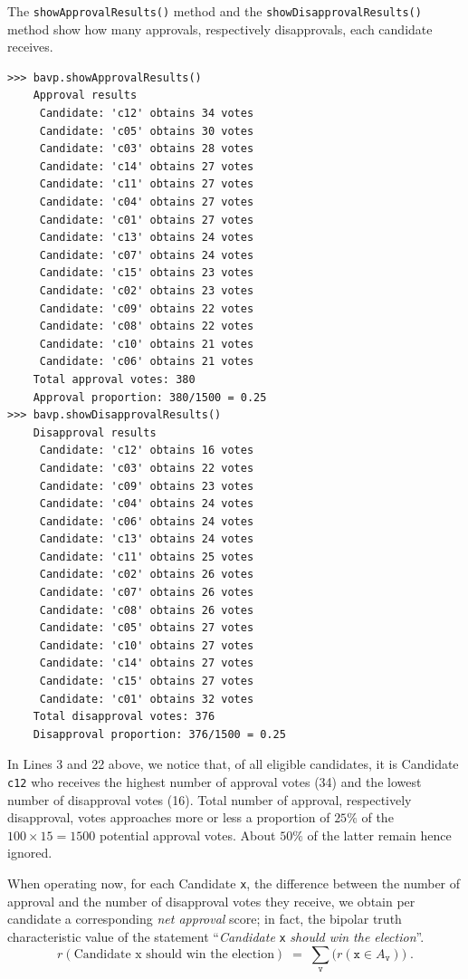 The \texttt{showApprovalResults()} method and the \texttt{showDisapprovalResults()} method show how many approvals, respectively disapprovals, each candidate receives.
\begin{lstlisting}
>>> bavp.showApprovalResults()
    Approval results
     Candidate: 'c12' obtains 34 votes
     Candidate: 'c05' obtains 30 votes
     Candidate: 'c03' obtains 28 votes
     Candidate: 'c14' obtains 27 votes
     Candidate: 'c11' obtains 27 votes
     Candidate: 'c04' obtains 27 votes
     Candidate: 'c01' obtains 27 votes
     Candidate: 'c13' obtains 24 votes
     Candidate: 'c07' obtains 24 votes
     Candidate: 'c15' obtains 23 votes
     Candidate: 'c02' obtains 23 votes
     Candidate: 'c09' obtains 22 votes
     Candidate: 'c08' obtains 22 votes
     Candidate: 'c10' obtains 21 votes
     Candidate: 'c06' obtains 21 votes
    Total approval votes: 380
    Approval proportion: 380/1500 = 0.25
>>> bavp.showDisapprovalResults()
    Disapproval results
     Candidate: 'c12' obtains 16 votes
     Candidate: 'c03' obtains 22 votes
     Candidate: 'c09' obtains 23 votes
     Candidate: 'c04' obtains 24 votes
     Candidate: 'c06' obtains 24 votes
     Candidate: 'c13' obtains 24 votes
     Candidate: 'c11' obtains 25 votes
     Candidate: 'c02' obtains 26 votes
     Candidate: 'c07' obtains 26 votes
     Candidate: 'c08' obtains 26 votes
     Candidate: 'c05' obtains 27 votes
     Candidate: 'c10' obtains 27 votes
     Candidate: 'c14' obtains 27 votes
     Candidate: 'c15' obtains 27 votes
     Candidate: 'c01' obtains 32 votes
    Total disapproval votes: 376
    Disapproval proportion: 376/1500 = 0.25
\end{lstlisting}

In Lines 3 and 22 above, we notice that, of all eligible candidates, it is Candidate \texttt{c12} who receives the highest number of approval votes (34) and the lowest number of disapproval votes (16). Total number of approval, respectively disapproval, votes approaches more or less a proportion of $25\%$ of the $100 \times 15 = 1500$ potential approval votes. About $50\%$ of the latter remain hence ignored. 

When operating now, for each Candidate \texttt{x}, the difference between the number of approval and the number of disapproval votes they receive, we obtain per candidate a corresponding \emph{net approval} score; in fact, the bipolar truth characteristic value of the statement ``\emph{Candidate} \texttt{x} \emph{should win the election}''.
\begin{equation}
r(\text{Candidate x should win the election}) \;=\; \sum_{\mathtt{v}} \big(r(\mathtt{x} \in A_{\mathtt{v}})\big)\;.
\end{equation}

